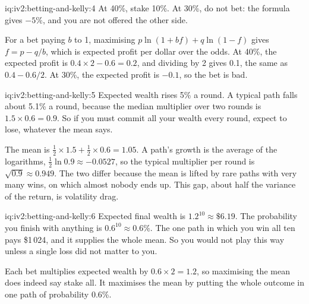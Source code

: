 \begin{solution}{iq:iv2:betting-and-kelly:4}
At 40\%, stake 10\%. At 30\%, do not bet: the formula gives $-5\%$, and you are not offered the other side.

For a bet paying $b$ to 1, maximising $p\ln(1 + bf) + q\ln(1 - f)$ gives $f = p - q/b$, which is expected profit per dollar over the odds. At 40\%, the expected profit is $0.4 \times 2 - 0.6 = 0.2$, and dividing by 2 gives 0.1, the same as $0.4 - 0.6/2$. At 30\%, the expected profit is $-0.1$, so the bet is bad.

\end{solution}

\begin{solution}{iq:iv2:betting-and-kelly:5}
Expected wealth rises 5\% a round. A typical path falls about 5.1\% a round, because the median multiplier over two rounds is $1.5 \times 0.6 = 0.9$. So if you must commit all your wealth every round, expect to lose, whatever the mean says.

The mean is $\tfrac12 \times 1.5 + \tfrac12 \times 0.6 = 1.05$. A path's growth is the average of the logarithms, $\tfrac12 \ln 0.9 \approx -0.0527$, so the typical multiplier per round is $\sqrt{0.9} \approx 0.949$. The two differ because the mean is lifted by rare paths with very many wins, on which almost nobody ends up. This gap, about half the variance of the return, is volatility drag.

\end{solution}

\begin{solution}{iq:iv2:betting-and-kelly:6}
Expected final wealth is $1.2^{10} \approx \$6.19$. The probability you finish with anything is $0.6^{10} \approx 0.6\%$. The one path in which you win all ten pays \$1\,024, and it supplies the whole mean. So you would not play this way unless a single loss did not matter to you.

Each bet multiplies expected wealth by $0.6 \times 2 = 1.2$, so maximising the mean does indeed say stake all. It maximises the mean by putting the whole outcome in one path of probability 0.6\%.

\end{solution}

